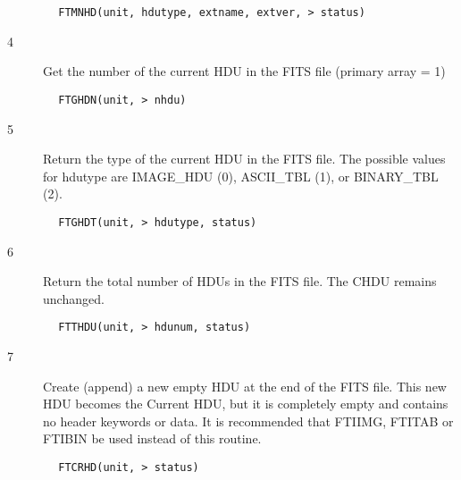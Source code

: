 \documentclass[11pt]{book}
\begin{document}
\begin{verbatim}
        FTMNHD(unit, hdutype, extname, extver, > status)
\end{verbatim}

\begin{description}
\item[4 ]Get the number of the current HDU in the FITS file (primary array = 1)
\end{description}

\begin{verbatim}
        FTGHDN(unit, > nhdu)
\end{verbatim}

\begin{description}
\item[5 ] Return the type of the current HDU in the FITS file.  The possible
   values for hdutype are IMAGE\_HDU (0), ASCII\_TBL (1), or BINARY\_TBL (2).
\end{description}

\begin{verbatim}
        FTGHDT(unit, > hdutype, status)
\end{verbatim}

\begin{description}
\item[6 ] Return the total number of HDUs in the FITS file.
   The CHDU remains unchanged.
\end{description}

\begin{verbatim}
        FTTHDU(unit, > hdunum, status)
\end{verbatim}

\begin{description}
\item[7 ]Create (append) a new empty HDU at the end of the FITS file.  This
    new HDU becomes the Current HDU, but it is completely empty and contains
    no header keywords or data.  It is recommended that FTIIMG, FTITAB or
   FTIBIN be used instead of this routine.
\end{description}

\begin{verbatim}
        FTCRHD(unit, > status)
\end{verbatim}
\end{document}
